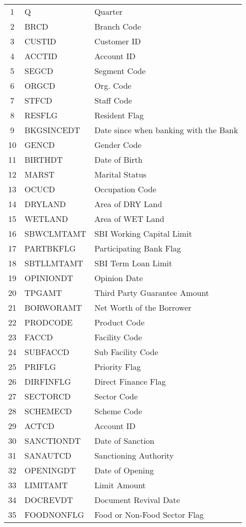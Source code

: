 \documentclass[a4paper]{article}
\begin{document}
\begin{longtable}{|c|l|p{8cm}|}
		1 & Q & Quarter \\
		2 & BRCD & Branch Code \\
		3 & CUSTID & Customer ID \\
		4 & ACCTID & Account ID \\
		5 & SEGCD & Segment Code \\
		6 & ORGCD & Org. Code \\
		7 & STFCD & Staff Code \\
		8 & RESFLG & Resident Flag \\
		9 & BKGSINCEDT & Date since when banking with the Bank \\
		10 & GENCD & Gender Code \\
		11 & BIRTHDT & Date of Birth \\
		12 & MARST & Marital Status \\
		13 & OCUCD & Occupation Code \\
		14 & DRYLAND & Area of DRY Land \\
		15 & WETLAND & Area of WET Land \\
		16 & SBWCLMTAMT & SBI Working Capital Limit \\
		17 & PARTBKFLG & Participating Bank Flag \\
		18 & SBTLLMTAMT & SBI Term Loan Limit \\
		19 & OPINIONDT & Opinion Date \\
		20 & TPGAMT & Third Party Guarantee Amount \\
		21 & BORWORAMT & Net Worth of the Borrower \\
		22 & PRODCODE & Product Code \\
		23 & FACCD & Facility Code \\
		24 & SUBFACCD & Sub Facility Code \\
		25 & PRIFLG & Priority Flag \\
		26 & DIRFINFLG & Direct Finance Flag \\
		27 & SECTORCD & Sector Code \\
		28 & SCHEMECD & Scheme Code \\
		29 & ACTCD & Account ID \\
		30 & SANCTIONDT & Date of Sanction \\
		31 & SANAUTCD & Sanctioning Authority \\
		32 & OPENINGDT & Date of Opening \\
		33 & LIMITAMT & Limit Amount \\
		34 & DOCREVDT & Document Revival Date \\
		35 & FOODNONFLG & Food or Non-Food Sector Flag \\

\end{longtable}
\end{document}
